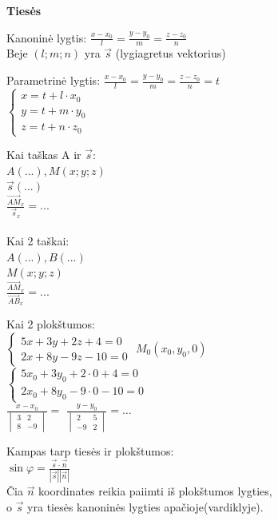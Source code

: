 \documentclass[fleqn]{article} %
\begin{document}
\begin{center} \textbf{Tiesės} \end{center}
\begin{multicols}{2}
    Kanoninė lygtis: 
    $\frac{x - x_0}{l} = \frac{y - y_0}{m} = \frac{z - z_0}{n}$ \\
    Beje $(l; m; n)$ yra $\vec{s}$ (lygiagretus vektorius)
    \vfill\null
    \columnbreak

    Parametrinė lygtis:
    $\frac{x - x_0}{l} = \frac{y - y_0}{m} = \frac{z - z_0}{n} = t$ \\
    $\begin{cases} x = t + l\cdot x_0 \\ y = t + m\cdot y_0 \\ z = t + n\cdot z_0 \end{cases}$

\end{multicols}
\begin{multicols}{3}
    Kai taškas A ir $\vec{s}$: \\
    $A(...), M(x; y; z)$ \\
    $\vec{s}(...)$ \\ 
    $\frac{\vec{AM}_x}{\vec{s}_x} = ...$ \\
    \\
    Kai 2 taškai: \\
    $A(...), B(...)$ \\
    $M(x; y; z)$ \\
    $\frac{\vec{AM}_x}{\vec{AB}_x} = ...$

    \vfill\null
    \columnbreak

    Kai 2 plokštumos: \\
    $\begin{cases} 5x + 3y + 2z + 4 = 0\\ 2x + 8y - 9z - 10 = 0 \end{cases}$
    $M_0(x_0, y_0, 0)$ \\
    $\begin{cases} 5x_0 + 3y_0 + 2\cdot 0 + 4 = 0\\ 2x_0 + 8y_0 - 9\cdot 0 - 10 = 0 \end{cases}$ \\
    $\frac{x - x_0}{\begin{vmatrix} 3 & 2 \\ 8 & -9 \end{vmatrix}} = $
    $\frac{y - y_0}{\begin{vmatrix} 2 & 5 \\ -9 & 2 \end{vmatrix}} = \dots$

    \vfill\null
    \columnbreak

    Kampas tarp tiesės ir plokštumos: \\
    $\sin\varphi = \frac{\vec{s}\cdot\vec{n}}{|\vec{s}||\vec{n}|}$ \\
    Čia $\vec{n}$ koordinates reikia paiimti iš plokštumos lygties, \\
    o $\vec{s}$ yra tiesės kanoninės lygties apačioje(vardiklyje).

\end{multicols}
\end{document}
